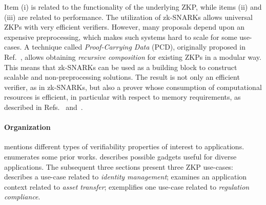 Item (i) is related to the functionality of the underlying ZKP, while items (ii) and (iii) are related to performance. 
The utilization of zk-SNARKs allows universal ZKPs with very efficient verifiers. 
However, many proposals depend upon an expensive preprocessing, which makes such systems hard to scale for some use-cases. 
A technique called \emph{Proof-Carrying Data} (PCD), originally proposed in Ref.~\cite{2010:ICS:proof-carrying-data}, allows obtaining \emph{recursive composition} for existing ZKPs in a modular way.
This means that zk-SNARKs can be used as a building block to construct scalable and non-preprocessing solutions. 
The result is not only an efficient verifier, as in zk-SNARKs, but also a prover whose consumption of computational resources is efficient, in particular with respect to memory requirements, as described in Refs.~\cite{2014:crypto:Scalable-ZK-via-Cycles-of-EC} and~\cite{2013:Recursive-Composition-and-Bootstrapping-for-SNARKS-and-Proof-carrying-Data}.
\loosen


\paragraph{Organization}
 mentions different types of verifiability properties of interest to applications.
 enumerates some prior works.
 describes possible gadgets useful for diverse applications.
The subsequent three sections present three ZKP use-cases:
 describes a use-case related to \emph{identity management};
 examines an application context related to \emph{asset transfer};
 exemplifies one use-case related to \emph{regulation compliance}.
